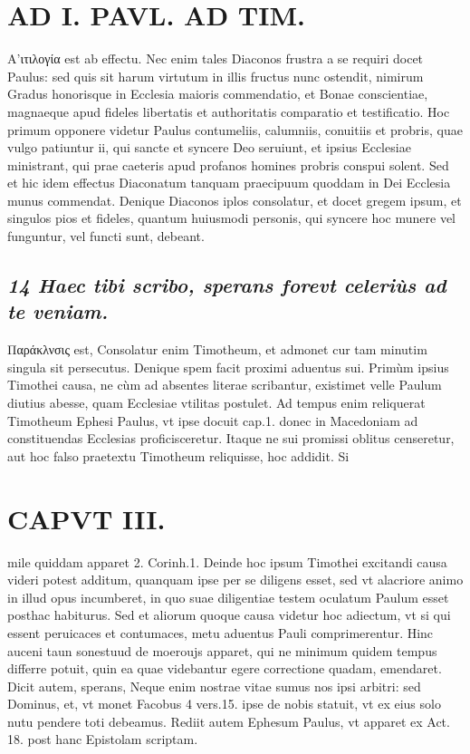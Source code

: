 \documentclass{article}
\begin{document}
\begin{pages}
\section*{AD I. PAVL. AD TIM. }
\marginpar{[ p.166 ]}\pstart Α'ιτιλογία est ab effectu. Nec enim tales Diaconos frustra a se requiri docet Paulus: sed quis sit harum virtutum in illis fructus nunc ostendit, nimirum Gradus honorisque in Ecclesia maioris commendatio, et Bonae conscientiae, magnaeque apud fideles libertatis et authoritatis comparatio et testificatio. Hoc primum opponere videtur Paulus contumeliis, calumniis, conuitiis et probris, quae vulgo patiuntur ii, qui sancte et syncere Deo seruiunt, et ipsius Ecclesiae ministrant, qui prae caeteris apud profanos homines probris conspui solent. Sed et hic idem effectus Diaconatum tanquam praecipuum quoddam in Dei Ecclesia munus commendat. Denique Diaconos iplos consolatur, et docet gregem ipsum, et singulos pios et fideles, quantum huiusmodi personis, qui syncere hoc munere vel funguntur, vel functi sunt, debeant.  \pend
{}
{}
\subsection*{\textit{14 Haec tibi scribo, sperans forevt celeriùs ad te veniam. }}\pstart Παράκλνσις est, Consolatur enim Timotheum, et admonet cur tam minutim singula sit persecutus. Denique spem facit proximi aduentus sui. Primùm ipsius Timothei causa, ne cùm ad absentes literae scribantur, existimet velle Paulum diutius abesse, quam Ecclesiae vtilitas postulet. Ad tempus enim reliquerat Timotheum Ephesi Paulus, vt ipse docuit cap.1. donec in Macedoniam ad constituendas Ecclesias proficisceretur. Itaque  ne sui promissi oblitus censeretur, aut hoc falso praetextu Timotheum reliquisse, hoc addidit. Si\pend
\section*{CAPVT  III. }
\marginpar{[ p.167 ]}\pstart mile quiddam apparet 2. Corinh.1. Deinde hoc ipsum Timothei excitandi causa videri potest additum, quanquam ipse per se diligens esset, sed vt alacriore animo in illud opus incumberet, in quo suae diligentiae testem oculatum Paulum esset posthac habiturus.  \pend\pstart Sed et aliorum quoque causa videtur hoc adiectum, vt si qui essent peruicaces et contumaces, metu aduentus Pauli comprimerentur. Hinc auceni taun sonestuud de moeroujs apparet, qui ne minimum quidem tempus differre potuit, quin ea quae videbantur egere correctione quadam, emendaret.  \pend\pstart Dicit autem, sperans, Neque enim nostrae vitae sumus nos ipsi arbitri: sed Dominus, et, vt monet Facobus 4 vers.15. ipse de nobis statuit, vt ex eius solo nutu pendere toti debeamus. Rediit autem Ephesum Paulus, vt apparet ex Act. 18. post hanc Epistolam scriptam.  \pend
{}
{}

\end{pages}
\end{document}
